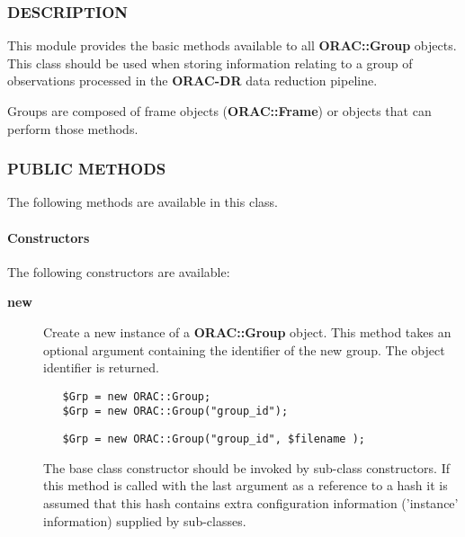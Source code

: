 \begin{description}
\begin{description}
\subsubsection*{DESCRIPTION\label{ORAC::Group_DESCRIPTION}}


This module provides the basic methods available to all
\textbf{ORAC::Group} objects. This class should be used when
storing information relating to a group of observations
processed in the \textbf{ORAC-DR} data reduction pipeline.



Groups are composed of frame objects (\textbf{ORAC::Frame})
or objects that can perform those methods.

\subsubsection*{PUBLIC METHODS\label{ORAC::Group_PUBLIC_METHODS}}


The following methods are available in this class.

\paragraph*{Constructors\label{ORAC::Group_Constructors}}


The following constructors are available:

\begin{description}

\item[{\textbf{new}}] \mbox{}

Create a new instance of a \textbf{ORAC::Group} object.
This method takes an optional argument containing the
identifier of the new group. The object identifier is returned.

\begin{verbatim}
   $Grp = new ORAC::Group;
   $Grp = new ORAC::Group("group_id");
\end{verbatim}
\begin{verbatim}
   $Grp = new ORAC::Group("group_id", $filename );
\end{verbatim}


The base class constructor should be invoked by sub-class constructors.
If this method is called with the last argument as a reference to
a hash it is assumed that this hash contains extra configuration
information ('instance' information) supplied by sub-classes.



\end{description}
\end{description}
\end{description}
